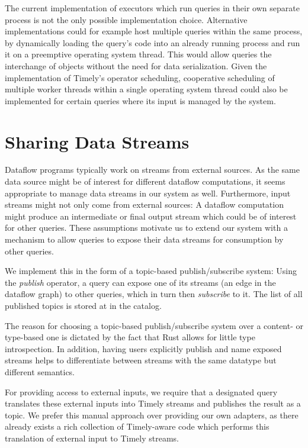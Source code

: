 The current implementation of executors which run queries in their own separate
process is not the only possible implementation choice.
Alternative implementations could for example host multiple queries
within the same process, by dynamically loading the query's code into an already
running process and run it on a preemptive operating system thread. This would allow queries
the interchange of objects without the need for data serialization. Given
the implementation of Timely's operator scheduling, cooperative scheduling
of multiple worker threads within a single operating system thread could also
be implemented for certain queries where its input is managed by the system.


\section{Sharing Data Streams} \label{sec:sharingstreams}

Dataflow programs typically work on streams from external sources. As the same
data source might be of interest for different dataflow computations, it seems
appropriate to manage data streams in our system as well. Furthermore,
input streams might not only come from external sources: A dataflow computation
might produce an intermediate or final output stream which could be of interest
for other queries. These assumptions motivate us to extend our system with a
mechanism to allow queries to expose their data streams for consumption by other
queries.

We implement this in the form of a topic-based publish/subscribe system:
Using the \emph{publish} operator, a query can expose one of its streams
(an edge in the dataflow graph) to other queries, which in turn then \emph{subscribe}
to it. The list of all published topics is stored at in the catalog.

The reason for choosing a topic-based publish/subscribe system over a
content- or type-based one is dictated by the fact that Rust allows for little
type introspection. In addition, having users explicitly publish and name
exposed streams helps to differentiate between streams with the same datatype
but different semantics.

For providing access to external inputs, we require that a designated query
translates these external inputs into Timely streams and publishes the result as
a topic. We prefer this manual approach over providing our own adapters, as there
already exists a rich collection of Timely-aware code which performs this
translation of external input to Timely streams.


